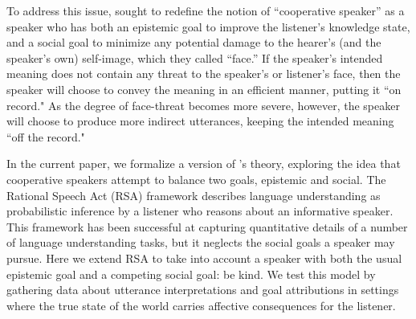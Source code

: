 \documentclass[10pt,letterpaper]{article}
\begin{document}
To address this issue,  sought to redefine the notion of ``cooperative speaker'' as a speaker
who has both an epistemic goal to improve the listener's knowledge state,
and a social goal to minimize any potential damage to the hearer's (and the speaker's own) self-image, which they called ``face.''
If the speaker's intended meaning does not contain any threat to the speaker's or listener's face,
then the speaker will choose to convey the meaning in an efficient manner, putting it ``on record."
As the degree of face-threat becomes more severe, however,
the speaker will choose to produce more indirect utterances, keeping the intended meaning ``off the record."

In the current paper, we formalize a version of 's theory, exploring the idea that cooperative speakers attempt to balance two goals, epistemic and social.
The Rational Speech Act (RSA) framework \cite{Frank2012, Goodman2013} describes language understanding as probabilistic inference by a listener who reasons about an informative speaker. This framework has been successful at capturing quantitative details of a number of language understanding tasks, but it neglects the social goals a speaker may pursue.
Here we extend RSA to take into account a speaker with both the usual epistemic goal and a competing social goal: be kind.
We test this model by gathering data about utterance interpretations and goal attributions in settings where the true state of the world carries affective consequences for the listener.
\end{document}
